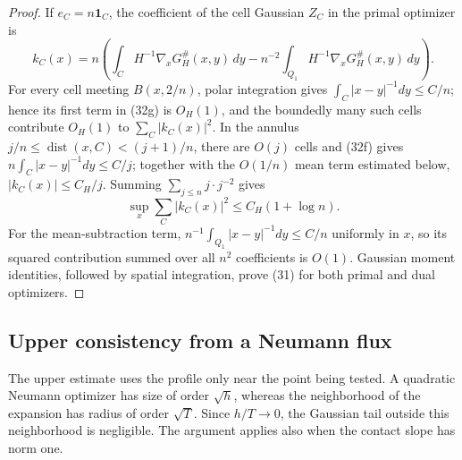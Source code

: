 \documentclass{smfart}
\theoremstyle{definition}
\newcommand{\1}{\mathbf 1}
\begin{document}
\begin{proof}
If $e_ C=n\mathbf1_ C$, the coefficient of the cell Gaussian $Z_ C$
in the primal optimizer is
\begin{equation}
k_ C(x)=n\left(\int_ C H^{-1}\nabla_ xG_ H^\#(x,y)\,dy
-n^{-2}\int_ {Q_ 1}H^{-1}\nabla_ xG_ H^\#(x,y)\,dy\right).
\tag{32g}
\end{equation}
For every cell meeting $B(x,2/n)$, polar integration gives
$\int_ C|x-y|^{-1}dy\leq C/n$; hence its first term in (32g) is
$O_ H(1)$, and the boundedly many such cells contribute $O_ H(1)$ to
$\sum_ C|k_ C(x)|^2$.  In the annulus
$j/n\leq\operatorname {dist}(x,C)<(j+1)/n$, there are $O(j)$
cells and (32f) gives
$n\int_ C|x-y|^{-1}dy\leq C/j$; together with the $O(1/n)$
mean term estimated below, $|k_ C(x)|\leq C_ H/j$.  Summing
$\sum_ {j\leq n}j\cdot j^{-2}$ gives
\begin{equation}
\sup_ x\sum_ C|k_ C(x)|^2\leq C_ H(1+\log n).
\tag{32h}
\end{equation}
For the mean-subtraction term,
$n^{-1}\int_ {Q_ 1}|x-y|^{-1}dy\leq C/n$ uniformly in $x$, so its
squared contribution summed over all $n^2$ coefficients is $O(1)$.
Gaussian moment identities, followed by spatial integration, prove
(31) for both primal and dual optimizers.

\end{proof}

\subsection{Upper consistency from a Neumann flux}

The upper estimate uses the profile only near the point being tested.
A quadratic Neumann optimizer has size of order $\sqrt h$, whereas
the neighborhood of the expansion has radius of order $\sqrt T$.
Since $h/T\to0$, the Gaussian tail outside this neighborhood is
negligible.  The argument applies also when the contact slope has
norm one.
\end{document}
